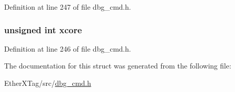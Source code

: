 Definition at line 247 of file dbg\-\_\-cmd.\-h.

\hypertarget{structdbg__cmd__type__jtag__pc__sample_a78357326dd562d441c3c73f5676ac638}{
\subsubsection[{xcore}]{\setlength{\rightskip}{0pt plus 5cm}unsigned int xcore}}\label{structdbg__cmd__type__jtag__pc__sample_a78357326dd562d441c3c73f5676ac638}


Definition at line 246 of file dbg\-\_\-cmd.\-h.



The documentation for this struct was generated from the following file\-:\begin{DoxyCompactItemize}
\item 
Ether\-X\-Tag/src/\hyperlink{dbg__cmd_8h}{dbg\-\_\-cmd.\-h}\end{DoxyCompactItemize}
